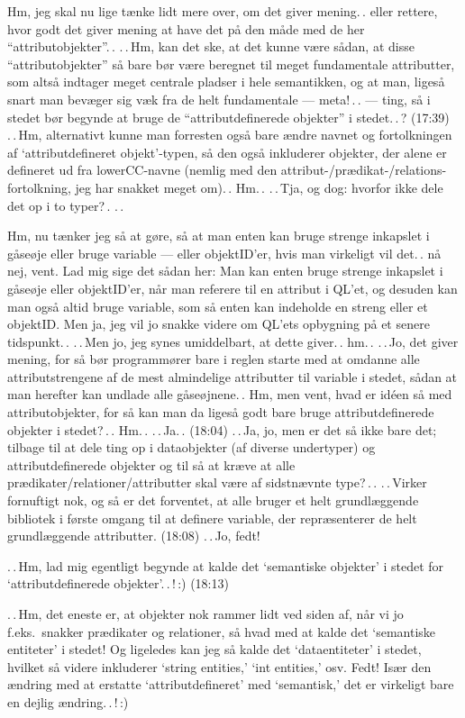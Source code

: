 \documentclass{report}
\begin{document}
Hm, jeg skal nu lige tænke lidt mere over, om det giver mening.\,. eller rettere, hvor godt det giver mening at have det på den måde med de her ``attributobjekter''.\,. .\,.\,Hm, kan det ske, at det kunne være sådan, at disse ``attributobjekter'' så bare bør være beregnet til meget fundamentale attributter, som altså indtager meget centrale pladser i hele semantikken, og at man, ligeså snart man bevæger sig væk fra de helt fundamentale --- meta!\,.\,. --- ting, så i stedet bør begynde at bruge de ``attributdefinerede objekter'' i stedet.\,.\,? (17:39) 
.\,.\,Hm, alternativt kunne man forresten også bare ændre navnet og fortolkningen af `attributdefineret objekt'-typen, så den også inkluderer objekter, der alene er defineret ud fra lowerCC-navne (nemlig med den attribut-/prædikat-/relations-fortolkning, jeg har snakket meget om).\,. Hm.\,. .\,.\,Tja, og dog: hvorfor ikke dele det op i to typer?\,. .\,. 

Hm, nu tænker jeg så at gøre, så at man enten kan bruge strenge inkapslet i gåseøje eller bruge variable --- eller objektID'er, hvis man virkeligt vil det.\,. nå nej, vent. Lad mig sige det sådan her: Man kan enten bruge strenge inkapslet i gåseøje eller objektID'er, når man referere til en attribut i QL'et, og desuden kan man også altid bruge variable, som så enten kan indeholde en streng eller et objektID. Men ja, jeg vil jo snakke videre om QL'ets opbygning på et senere tidspunkt.\,. .\,.\,Men jo, jeg synes umiddelbart, at dette giver.\,. hm.\,. .\,.\,Jo, det giver mening, for så bør programmører bare i reglen starte med at omdanne alle attributstrengene af de mest almindelige attributter til variable i stedet, sådan at man herefter kan undlade alle gåseøjnene.\,. Hm, men vent, hvad er idéen så med attributobjekter, for så kan man da ligeså godt bare bruge attributdefinerede objekter i stedet?\,.\,. Hm.\,. .\,.\,Ja.\,. (18:04) .\,.\,Ja, jo, men er det så ikke bare det; tilbage til at dele ting op i dataobjekter (af diverse undertyper) og attributdefinerede objekter og til så at kræve at alle prædikater/relationer/attributter skal være af sidstnævnte type?\,.\,. .\,.\,Virker fornuftigt nok, og så er det forventet, at alle bruger et helt grundlæggende bibliotek i første omgang til at definere variable, der repræsenterer de helt grundlæggende attributter. (18:08) .\,.\,Jo, fedt! 

.\,.\,Hm, lad mig egentligt begynde at kalde det `semantiske objekter' i stedet for `attributdefinerede objekter'.\,.\,!\,:) (18:13)

.\,.\,Hm, det eneste er, at objekter nok rammer lidt ved siden af, når vi jo f.eks.\ snakker prædikater og relationer, så hvad med at kalde det `semantiske entiteter' i stedet! Og ligeledes kan jeg så kalde det `dataentiteter' i stedet, hvilket så videre inkluderer `string entities,' `int entities,' osv. Fedt! Især den ændring med at erstatte `attributdefineret' med `semantisk,' det er virkeligt bare en dejlig ændring.\,.\,!\,:) 
\end{document}
